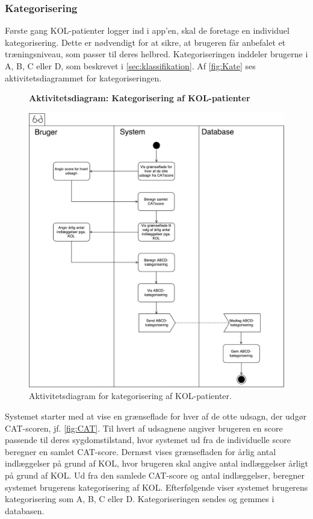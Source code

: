 \subsubsection*{Kategorisering} \label{sec:kategorisering}
Første gang KOL-patienter logger ind i app'en, skal de foretage en individuel kategorisering. Dette er nødvendigt for at sikre, at brugeren får anbefalet et træningsniveau, som passer til deres helbred.
Kategoriseringen inddeler brugerne i A, B, C eller D, som beskrevet i \autoref{sec:klassifikation}. Af \autoref{fig:Kate} ses aktivitetsdiagrammet for kategoriseringen.

\begin{figure} [H]
\centering
\textbf{Aktivitetsdiagram: Kategorisering af KOL-patienter}\par\medskip
\includegraphics[width=1\textwidth]{figures/aktivitetsdiagram/Kategorisering}
\caption{Aktivitetsdiagram for kategorisering af KOL-patienter.}
\label{fig:Kate}
\end{figure}

\noindent
Systemet starter med at vise en grænseflade for hver af de otte udsagn, der udgør CAT-scoren, jf. \autoref{fig:CAT}. Til hvert af udsagnene angiver brugeren en score passende til deres sygdomstilstand, hvor systemet ud fra de individuelle score beregner en samlet CAT-score. 
Dernæst vises grænsefladen for årlig antal indlæggelser på grund af KOL, hvor brugeren skal angive antal indlæggelser årligt på grund af KOL. Ud fra den samlede CAT-score og antal indlæggelser, beregner systemet brugerens kategorisering af KOL. Efterfølgende viser systemet brugerens kategorisering som  A, B, C eller D.
Kategoriseringen sendes og gemmes i databasen.  